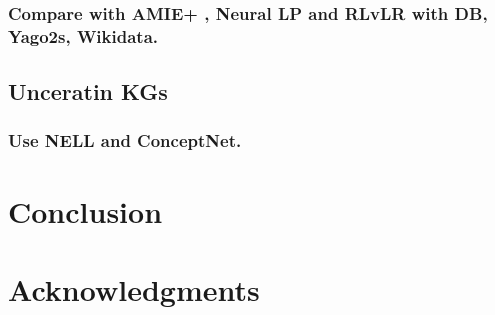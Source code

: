 \documentclass{article}
\begin{document}
	\subsubsection{Compare with AMIE+ , Neural LP and RLvLR with DB, Yago2s, Wikidata.}
	\subsection{Unceratin KGs}
	\subsubsection{Use NELL and ConceptNet.}
	
	
	\section{Conclusion}
	
	
	\section*{Acknowledgments}
	
	
	
	
	
\end{document}
